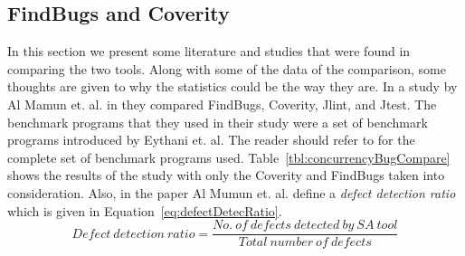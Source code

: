 \documentclass[10pt,oneside]{IEEEtran}
\begin{document}
\subsection{FindBugs and Coverity}
In this section we present some literature and studies that were found in comparing the two tools. Along with some of the data of the comparison, some thoughts are given to why the statistics could be the way they are. In a study by Al Mamun et. al. in \cite{11} they compared FindBugs, Coverity, Jlint, and Jtest. The benchmark programs that they used in their study were a set of benchmark programs introduced by Eythani et. al. The reader should refer to \cite{11} for the complete set of benchmark programs used. Table~\ref{tbl:concurrencyBugCompare} shows the results of the study with only the Coverity and FindBugs taken into consideration. Also, in the paper Al Mumun et. al. define a \textit{defect detection ratio} which is given in Equation~\ref{eq:defectDetecRatio}.
\small
\begin{equation}
  \label{eq:defectDetecRatio}
  Defect\ detection\ ratio = \frac{No.\ of\ defects\ detected\ by\ SA\ tool}{Total\ number\ of\ defects}
\end{equation}
\normalsize
\end{document}
